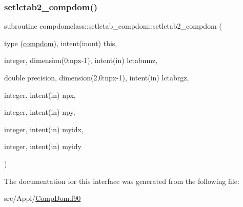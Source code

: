 \mbox{\label{interfacecompdomclass_1_1setlctab__compdom_a3951c1216f28b4bb9abce40a1358195c}} 
\subsubsection{\texorpdfstring{setlctab2\_compdom()}{setlctab2\_compdom()}}
{\footnotesize\ttfamily subroutine compdomclass\+::setlctab\+\_\+compdom\+::setlctab2\+\_\+compdom (\begin{DoxyParamCaption}\item[{type (\mbox{\hyperlink{namespacecompdomclass_structcompdomclass_1_1compdom}{compdom}}), intent(inout)}]{this,  }\item[{integer, dimension(0\+:npx-\/1), intent(in)}]{lctabnmz,  }\item[{double precision, dimension(2,0\+:npx-\/1), intent(in)}]{lctabrgz,  }\item[{integer, intent(in)}]{npx,  }\item[{integer, intent(in)}]{npy,  }\item[{integer, intent(in)}]{myidx,  }\item[{integer, intent(in)}]{myidy }\end{DoxyParamCaption})}



The documentation for this interface was generated from the following file\+:\begin{DoxyCompactItemize}
\item 
src/\+Appl/\mbox{\hyperlink{_comp_dom_8f90}{Comp\+Dom.\+f90}}\end{DoxyCompactItemize}
